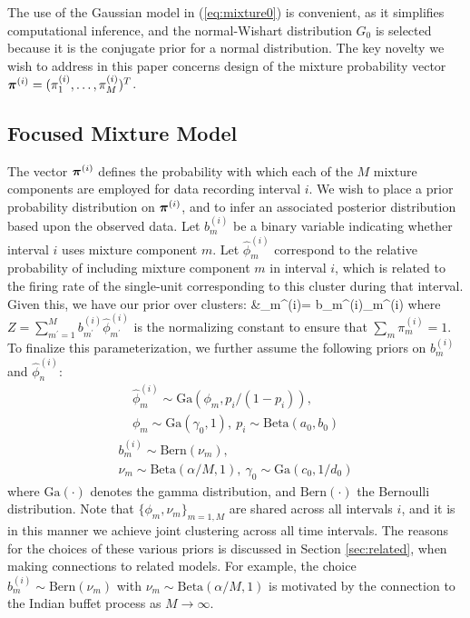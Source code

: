 \documentclass[journal]{IEEEtran}
\begin{document}
The use of the Gaussian model in (\ref{eq:mixture0}) is convenient, as it simplifies computational inference, and the normal-Wishart distribution $G_0$ is selected because it is the conjugate prior for a normal distribution. The key novelty we wish to address in this paper concerns design of the mixture probability vector $\boldsymbol{\pi}^{(i)}=(\pi_1^{(i)},\dots,\pi_{M}^{(i)})^T$.%


\subsection{{Focused Mixture Model}\label{sec:focused}}

{The vector $\boldsymbol{\pi}^{(i)}$ defines the probability with which each of the $M$ mixture components are employed for data recording interval $i$. We wish to place a prior probability distribution on $\boldsymbol{\pi}^{(i)}$, and to infer an associated posterior distribution based upon the observed data. Let $b_m^{(i)}$ be a binary variable indicating whether interval $i$ uses mixture component $m$.  Let $\hat{\phi}_m^{(i)}$ correspond to the relative probability of including mixture component $m$ in interval $i$, which is related to the firing rate of the single-unit corresponding to this cluster during that interval.  Given this, we have our prior over clusters:}
\beqs %
&\pi_m^{(i)}=  b_m^{(i)}\hat{\phi}_m^{(i)} 
\label{eq:mixt}\eeqs 
{where $Z=\sum_{m^\prime=1}^M b_{m^\prime}^{(i)}\hat{\phi}_{m^\prime}^{(i)}$ is the normalizing constant to ensure that $\sum_m \pi_m^{(i)}=1$.  To finalize this parameterization, we further assume the following priors on $b_m^{(i)}$ and $\hat{\phi}_n^{(i)}$:}
\begin{multline} \label{eq:gen1}
\hat{\phi}_m^{(i)}\sim \mbox{Ga}(\phi_m,p_i/(1-p_i)), \\
\phi_m\sim\mbox{Ga}(\gamma_0,1) ,~p_i\sim\mbox{Beta}(a_0,b_0)
\end{multline}
\begin{multline} \label{eq:gen2}
b_m^{(i)}\sim\mbox{Bern}(\nu_m), \\
\nu_m\sim\mbox{Beta}(\alpha/M,1),~\gamma_0\sim\mbox{Ga}(c_0,1/d_0)
\end{multline}
where $\mbox{Ga}(\cdot)$ denotes the gamma distribution, and $\mbox{Bern}(\cdot)$ the Bernoulli distribution. Note that $\{\phi_m,\nu_m\}_{m=1,M}$ are shared across all intervals $i$, and it is in this manner we achieve joint clustering across all {time} intervals. 
The reasons for the choices of these various priors is discussed in Section \ref{sec:related}, when making connections to related models. For example, the choice $b_m^{(i)}\sim\mbox{Bern}(\nu_m)$ with $\nu_m\sim\mbox{Beta}(\alpha/M,1)$ is motivated by the connection to the Indian buffet process \cite{IBP} as $M\rightarrow\infty$.
\end{document}
